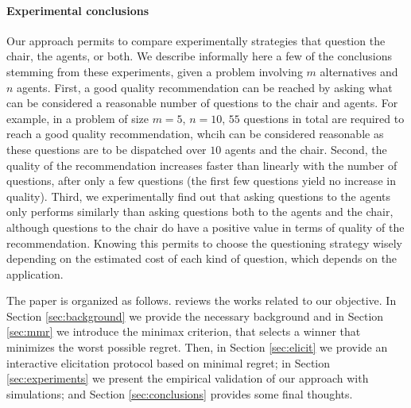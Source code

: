 \documentclass[sigconf, anonymous]{aamas}
\begin{document}
\paragraph{Experimental conclusions}
Our approach permits to compare experimentally strategies that question the chair, the agents, or both. We describe informally here a few of the conclusions stemming from these experiments, given a problem involving $m$ alternatives and $n$ agents. First, a good quality recommendation can be reached by asking what can be considered a reasonable number of questions to the chair and agents. For example, in a problem of size $m = 5$, $n = 10$, $55$ questions in total are required to reach a good quality recommendation, whcih can be considered reasonable as these questions are to be dispatched over $10$ agents and the chair.
Second, the quality of the recommendation increases faster than linearly with the number of questions, after only a few questions (the first few questions yield no increase in quality).
Third, we experimentally find out that asking questions to the agents only performs similarly than asking questions both to the agents and the chair, although questions to the chair do have a positive value in terms of quality of the recommendation.
Knowing this permits to choose the questioning strategy wisely depending on the estimated cost of each kind of question, which depends on the application. 

The paper is organized as follows.  reviews the works related to our objective.
In Section \ref{sec:background} we provide the necessary background and in Section \ref{sec:mmr} we introduce the minimax criterion, that selects a winner that minimizes the worst possible regret.
Then, in Section \ref{sec:elicit} we provide an interactive elicitation protocol based on minimal regret;  in Section \ref{sec:experiments} we present the empirical validation of our approach with simulations; and Section \ref{sec:conclusions} provides some final thoughts.
\end{document}
